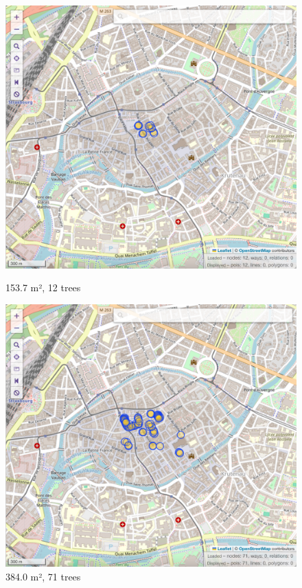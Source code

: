 \documentclass[12pt]{article}
\begin{document}
\begin{figure}[H]
    \centering
    \begin{minipage}{0.45\textwidth}
        \centering
        \includegraphics[width=\textwidth]{images/bbox1.png}
        \caption{153.7 m², 12 trees}
    \end{minipage}\hfill
    \begin{minipage}{0.45\textwidth}
        \centering
        \includegraphics[width=\textwidth]{images/bbox2.png}
        \caption{384.0 m², 71 trees}
    \end{minipage}
\end{figure}
\end{document}
